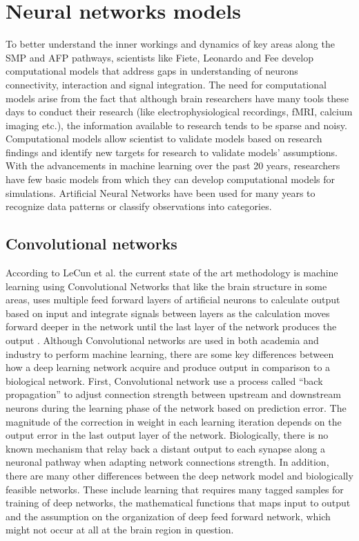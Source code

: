 \documentclass[draft,12pt,oneside]{CUNY_PhD}
\begin{document}
\chapter{Neural networks models}
To better understand the inner workings and dynamics of key areas along the SMP and AFP pathways, scientists like Fiete, Leonardo and Fee \cite{2}\cite{3}\cite{5} develop computational models that address gaps in understanding of neurons connectivity, interaction and signal integration. The need for computational models arise from the fact that although brain researchers have many tools these days to conduct their research (like electrophysiological recordings, fMRI, calcium imaging etc.), the information available to research tends to be sparse and noisy. Computational models allow scientist to validate models based on research findings and identify new targets for research to validate models’ assumptions.
With the advancements in machine learning over the past 20 years, researchers have few basic models from which they can develop computational models for simulations. Artificial Neural Networks have been used for many years to recognize data patterns or classify observations into categories.
\section{Convolutional networks}
According to LeCun et al. the current state of the art methodology is machine learning using Convolutional Networks that like the brain structure in some areas, uses multiple feed forward layers of artificial neurons to calculate output based on input and integrate signals between layers as the calculation moves forward deeper in the network until the last layer of the network produces the output \cite{13}. 
Although Convolutional networks are used in both academia and industry to perform machine learning, there are some key differences between how a deep learning network acquire and produce output in comparison to a biological network. 
First, Convolutional network use a process called “back propagation” to adjust connection strength between upstream and downstream neurons during the learning phase of the network based on prediction error. The magnitude of the correction in weight in each learning iteration depends on the output error in the last output layer of the network. Biologically, there is no known mechanism that relay back a distant output to each synapse along a neuronal pathway when adapting network connections strength. 
In addition, there are many other differences between the deep network model and biologically feasible networks. These include learning that requires many tagged samples for training of deep networks, the mathematical functions that maps input to output and the assumption on the organization of deep feed forward network, which might not occur at all at the brain region in question. 
\end{document}
